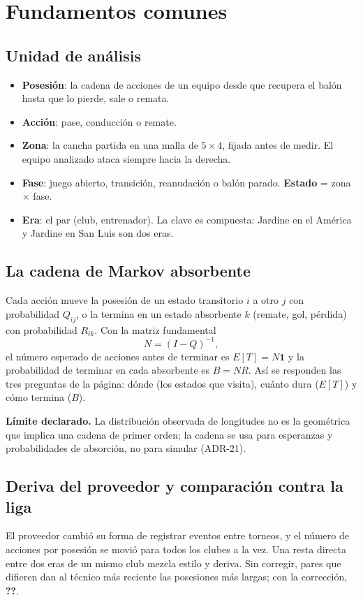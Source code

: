 \documentclass[11pt,a4paper]{article}
\newcommand{\cifraFirmaDid}{\textbf{??}}}
\begin{document}
\section{Fundamentos comunes}

\subsection{Unidad de análisis}
\begin{itemize}
\item \textbf{Posesión}: la cadena de acciones de un equipo desde que recupera el
  balón hasta que lo pierde, sale o remata.
\item \textbf{Acción}: pase, conducción o remate.
\item \textbf{Zona}: la cancha partida en una malla de $5\times 4$, fijada antes de
  medir. El equipo analizado ataca siempre hacia la derecha.
\item \textbf{Fase}: juego abierto, transición, reanudación o balón parado.
  \textbf{Estado} = zona $\times$ fase.
\item \textbf{Era}: el par (club, entrenador). La clave es compuesta: Jardine en el
  América y Jardine en San Luis son dos eras.
\end{itemize}

\subsection{La cadena de Markov absorbente}
Cada acción mueve la posesión de un estado transitorio $i$ a otro $j$ con
probabilidad $Q_{ij}$, o la termina en un estado absorbente $k$ (remate, gol,
pérdida) con probabilidad $R_{ik}$. Con la matriz fundamental
\[
N = (I - Q)^{-1},
\]
el número esperado de acciones antes de terminar es $E[T] = N\mathbf{1}$ y la
probabilidad de terminar en cada absorbente es $B = N R$. Así se responden las
tres preguntas de la página: dónde (los estados que visita), cuánto dura
($E[T]$) y cómo termina ($B$).

\textbf{Límite declarado.} La distribución observada de longitudes no es la
geométrica que implica una cadena de primer orden; la cadena se usa para
esperanzas y probabilidades de absorción, no para simular (ADR-21).

\subsection{Deriva del proveedor y comparación contra la liga}\label{sec:deriva}
El proveedor cambió su forma de registrar eventos entre torneos, y el número
de acciones por posesión se movió para todos los clubes a la vez. Una resta
directa entre dos eras de un mismo club mezcla estilo y deriva. Sin corregir,
\cifraFirmaCru{} pares que difieren dan al técnico más reciente las posesiones
más largas; con la corrección, \cifraFirmaDid{}.
\end{document}
